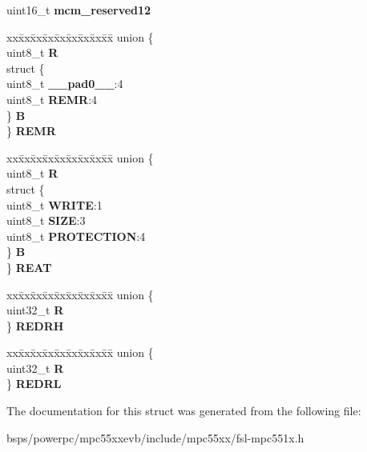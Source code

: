 \begin{DoxyCompactItemize}
\begin{tabbing}
\end{tabbing}\item 
\mbox{\label{structMCM__tag_a272ce77d64df03717fe502a838ffba4e}} 
uint16\+\_\+t {\bfseries mcm\+\_\+reserved12}
\item 
\mbox{\label{structMCM__tag_aaea2e23b89ebe2573f03d2c78bb0230a}} 
\begin{tabbing}
xx\=xx\=xx\=xx\=xx\=xx\=xx\=xx\=xx\=\kill
union \{\\
\>uint8\_t {\bfseries R}\\
\>struct \{\\
\>\>uint8\_t {\bfseries \_\_pad0\_\_}:4\\
\>\>uint8\_t {\bfseries REMR}:4\\
\>\} {\bfseries B}\\
\} {\bfseries REMR}\\

\end{tabbing}\item 
\mbox{\label{structMCM__tag_a7f5cb7acc2fa097fcf5e84413fa85b26}} 
\begin{tabbing}
xx\=xx\=xx\=xx\=xx\=xx\=xx\=xx\=xx\=\kill
union \{\\
\>uint8\_t {\bfseries R}\\
\>struct \{\\
\>\>uint8\_t {\bfseries WRITE}:1\\
\>\>uint8\_t {\bfseries SIZE}:3\\
\>\>uint8\_t {\bfseries PROTECTION}:4\\
\>\} {\bfseries B}\\
\} {\bfseries REAT}\\

\end{tabbing}\item 
\mbox{\label{structMCM__tag_aca07126f9fe899e715c5e02ae2df4d97}} 
\begin{tabbing}
xx\=xx\=xx\=xx\=xx\=xx\=xx\=xx\=xx\=\kill
union \{\\
\>uint32\_t {\bfseries R}\\
\} {\bfseries REDRH}\\

\end{tabbing}\item 
\mbox{\label{structMCM__tag_a47c10e852fa0012cf91c43a5b4be46a4}} 
\begin{tabbing}
xx\=xx\=xx\=xx\=xx\=xx\=xx\=xx\=xx\=\kill
union \{\\
\>uint32\_t {\bfseries R}\\
\} {\bfseries REDRL}\\

\end{tabbing}\end{DoxyCompactItemize}


The documentation for this struct was generated from the following file\+:\begin{DoxyCompactItemize}
\item 
bsps/powerpc/mpc55xxevb/include/mpc55xx/fsl-\/mpc551x.\+h\end{DoxyCompactItemize}
